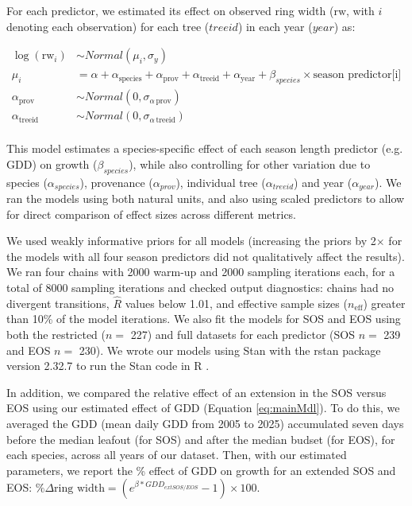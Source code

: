 \documentclass{article}\usepackage[]{graphicx}\usepackage[]{xcolor}
\begin{document}
For each predictor, we estimated its effect on observed ring width ($\text{rw}$, with $i$ denoting each observation) for each tree ($treeid$) in each year ($year$) as:

\begin{equation}
\begin{aligned}
\log(\text{rw}_i) &\sim Normal(\mu_i, \sigma_y) \\ 
\mu_i &= \alpha + \alpha_{\text{species}} + \alpha_{\text{prov}} + \alpha_{\text{treeid}} + \alpha_{\text{year}} + \beta_{species} \times \text{season predictor[i]} \\
\alpha_{\text{prov}} &\sim Normal(0, \sigma_{\alpha \, \text{prov}}) \\
\alpha_{\text{treeid}} &\sim Normal(0, \sigma_{\alpha \, \text{treeid}}) \\
\end{aligned}
\label{eq:mainMdl}
\end{equation}

This model estimates a species-specific effect of each season length predictor (e.g. GDD) on growth ($\beta_{species}$), while also controlling for other variation due to species ($\alpha_{species}$), provenance ($\alpha_{prov}$), individual tree ($\alpha_{treeid}$) and year ($\alpha_{year}$). We ran the models using both natural units, and also using scaled predictors \citep[via $z$-scoring,][]{gelman_data_2006} to allow for direct comparison of effect sizes across different metrics.

We used weakly informative priors for all models (increasing the priors by 2$\times$ for the models with all four season predictors did not qualitatively affect the results). We ran four chains with 2000 warm-up and 2000 sampling iterations each, for a total of 8000 sampling iterations and checked output diagnostics: chains had no divergent transitions, $\hat{R}$ values below 1.01, and effective sample sizes ($n_{\text{eff}}$) greater than 10\% of the model iterations. We also fit the models for SOS and EOS using both the restricted ($n =$ 227) and full datasets for each predictor (SOS $n =$ 239 and EOS $n =$ 230). We wrote our models using Stan \citep{carpenter_stan_2017} with the rstan package version 2.32.7 \citep{standevelopmentteam_rstan_2025} to run the Stan code in R \citep{rcoreteam_language_2021}.

In addition, we compared the relative effect of an extension in the SOS versus EOS using our estimated effect of GDD (Equation \ref{eq:mainMdl}). To do this, we averaged the GDD (mean daily GDD from 2005 to 2025) accumulated seven days before the median leafout (for SOS) and after the median budset (for EOS), for each species, across all years of our dataset. Then, with our estimated parameters, we report the \% effect of GDD on growth for an extended SOS and EOS: $\% \Delta \text{ring width} = (e^{\beta*GDD_{extSOS/EOS}}-1) \times 100$.
\end{document}
